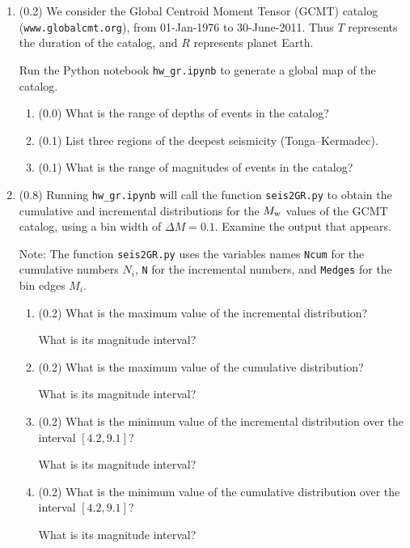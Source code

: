 \documentclass[11pt,titlepage,fleqn]{article}
\begin{document}
\begin{enumerate}
\item (0.2) We consider the Global Centroid Moment Tensor (GCMT) catalog (\verb+www.globalcmt.org+), from 01-Jan-1976 to 30-June-2011. Thus $T$ represents the duration of the catalog, and $R$ represents planet Earth.

Run the Python notebook \verb+hw_gr.ipynb+ to generate a global map of the catalog.
%
\begin{enumerate}
\item (0.0) What is the range of depths of events in the catalog?
\item (0.1) List three regions of the deepest seismicity (\eg Tonga--Kermadec).
\item (0.1) What is the range of magnitudes of events in the catalog?
\end{enumerate}

\item (0.8) Running \verb+hw_gr.ipynb+ will call the function \verb+seis2GR.py+ to obtain the cumulative and incremental distributions for the $M_{\rm w}$ values of the GCMT catalog, using a bin width of $\Delta M = 0.1$. Examine the output that appears.

Note: The function \verb+seis2GR.py+ uses the variables names \verb+Ncum+ for the cumulative numbers $N_i$, \verb+N+ for the incremental numbers, and \verb+Medges+ for the bin edges $M_i$.

\begin{enumerate}
\item (0.2) What is the maximum value of the incremental distribution?

What is its magnitude interval?

\item (0.2) What is the maximum value of the cumulative distribution?

What is its magnitude interval?

\item (0.2) What is the minimum value of the incremental distribution over the interval $[4.2,9.1]$? 

What is its magnitude interval?

\item (0.2) What is the minimum value of the cumulative distribution over the interval $[4.2,9.1]$? 

What is its magnitude interval?

\end{enumerate}


\end{enumerate}
\end{document}

